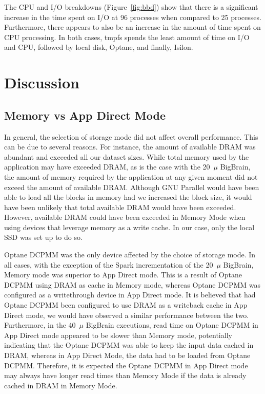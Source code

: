 \documentclass[conference]{IEEEtran}
\newcommand{\bigbrain}{BigBrain\xspace}
\begin{document}
The CPU and I/O breakdowns (Figure~\ref{fig:bbd}) show that there is a significant increase
in the time spent on I/O at 96 processes when compared to 25 processes. Furthermore, there appears
to also be an increase in the amount of time spent on CPU processing. In both cases,
tmpfs spends the least amount of time on I/O and CPU, followed by local disk, Optane, and finally,
Isilon.
\section{Discussion}
\subsection{Memory vs App Direct Mode}

In general, the selection of storage mode did not affect overall performance. This can be
due to several reasons. For instance, the amount of available DRAM was abundant and exceeded 
all our dataset sizes. While total memory used by the application may have exceeded DRAM, as is the
case with the 20~$\mu$ \bigbrain, the amount of memory required by the application at any 
given moment did not exceed the amount of available DRAM. Although GNU Parallel would have
been able to load all the blocks in memory had we increased the block size, it would have been unlikely
that total available DRAM would have been exceeded. However, available DRAM could have been exceeded in
Memory Mode when using devices that leverage memory as a write cache.
In our case, only the local SSD was set up to do so.

Optane DCPMM was the only device affected by the choice of storage mode. In all cases, with the 
exception of the Spark incrementation of the 20~$\mu$ \bigbrain, Memory mode was superior to 
App Direct mode. This is a result of Optane DCPMM using DRAM as cache in Memory mode, whereas Optane
DCPMM 
was configured as a writethrough device in App Direct mode. It is believed that had Optane DCPMM been
configured to use DRAM as a writeback cache in App Direct mode, we would have observed a similar
performance between the two. Furthermore, in the 40~$\mu$ \bigbrain executions, read time on Optane DCPMM in
App Direct mode appeared to be slower than Memory mode, potentially indicating that the Optane DCPMM was able
to keep the input data cached in DRAM, whereas in App Direct Mode, the data had to be loaded from Optane DCPMM.
Therefore, it is expected the Optane DCPMM in App Direct mode may always have longer read times than Memory Mode
if the data is already cached in DRAM in Memory Mode.
\end{document}
